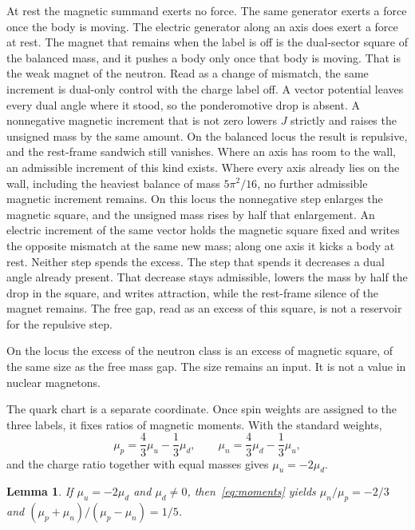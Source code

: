 \documentclass[a4paper]{article}
\newtheorem{lemma}{Lemma}
\begin{document}
At rest the magnetic summand exerts no force. The same generator exerts a force once the body is moving. The electric generator along an axis does exert a force at rest. The magnet that remains when the label is off is the dual-sector square of the balanced mass, and it pushes a body only once that body is moving. That is the weak magnet of the neutron. Read as a change of mismatch, the same increment is dual-only control with the charge label off. A vector potential leaves every dual angle where it stood, so the ponderomotive drop is absent. A nonnegative magnetic increment that is not zero lowers \(J\) strictly and raises the unsigned mass by the same amount. On the balanced locus the result is repulsive, and the rest-frame sandwich still vanishes. Where an axis has room to the wall, an admissible increment of this kind exists. Where every axis already lies on the wall, including the heaviest balance of mass \(5\pi^2/16\), no further admissible magnetic increment remains. On this locus the nonnegative step enlarges the magnetic square, and the unsigned mass rises by half that enlargement. An electric increment of the same vector holds the magnetic square fixed and writes the opposite mismatch at the same new mass; along one axis it kicks a body at rest. Neither step spends the excess. The step that spends it decreases a dual angle already present. That decrease stays admissible, lowers the mass by half the drop in the square, and writes attraction, while the rest-frame silence of the magnet remains. The free gap, read as an excess of this square, is not a reservoir for the repulsive step.

On the locus the excess of the neutron class is an excess of magnetic square, of the same size as the free mass gap. The size remains an input. It is not a value in nuclear magnetons.

The quark chart is a separate coordinate. Once spin weights are assigned to the three labels, it fixes ratios of magnetic moments. With the standard weights,
\begin{equation}
\label{eq:moments}
\mu_p=\frac43\mu_u-\frac13\mu_d,
\qquad
\mu_n=\frac43\mu_d-\frac13\mu_u,
\end{equation}
and the charge ratio together with equal masses gives \(\mu_u=-2\mu_d\).

\begin{lemma}
\label{lem:moments}
If \(\mu_u=-2\mu_d\) and \(\mu_d\neq 0\), then~\eqref{eq:moments} yields \(\mu_n/\mu_p=-2/3\) and \((\mu_p+\mu_n)/(\mu_p-\mu_n)=1/5\).
\end{lemma}
\end{document}
